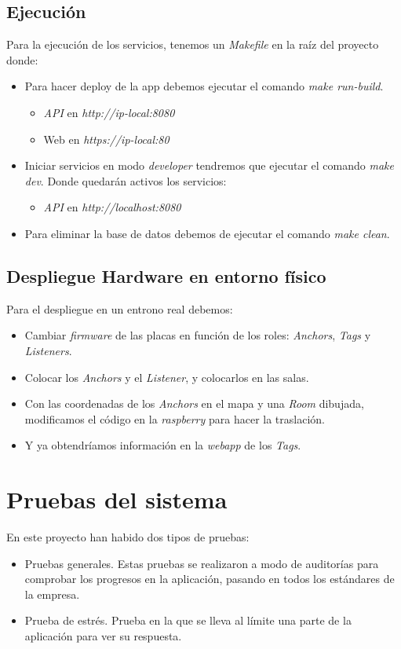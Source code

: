 \subsection{Ejecución}
Para la ejecución de los servicios, tenemos un \textit{Makefile} en la raíz del proyecto donde:
\begin{itemize}
    \item Para hacer deploy de la app debemos ejecutar el comando \textit{make run-build}.
    \begin{itemize}
        \item \textit{API} en \textit{http://ip-local:8080}
        \item Web en \textit{https://ip-local:80}
    \end{itemize}
    \item Iniciar servicios en modo \textit{developer} tendremos que ejecutar el comando \textit{make dev}. Donde quedarán activos los servicios:
    \begin{itemize}
        \item \textit{API} en \textit{http://localhost:8080}
    \end{itemize}
    
    \item Para eliminar la base de datos debemos de ejecutar el comando \textit{make clean}.
\end{itemize}
\subsection{Despliegue Hardware en entorno físico}
Para el despliegue en un entrono real debemos:
\begin{itemize}
    \item Cambiar \textit{firmware} de las placas en función de los roles: \textit{Anchors}, \textit{Tags} y \textit{Listeners}.
    \item Colocar los \textit{Anchors} y el \textit{Listener}, y colocarlos en las salas.
    \item Con las coordenadas de los \textit{Anchors} en el mapa y una \textit{Room} dibujada, modificamos el código en la \textit{raspberry} para hacer la traslación. 
    \item Y ya obtendríamos información en la \textit{webapp} de los \textit{Tags}.
\end{itemize}
\section{Pruebas del sistema}
En este proyecto han habido dos tipos de pruebas:
\begin{itemize}
    \item Pruebas generales. Estas pruebas se realizaron a modo de auditorías para comprobar los progresos en la aplicación, pasando en todos los estándares de la empresa.
    \item Prueba de estrés. Prueba en la que se lleva al límite una parte de la aplicación para ver su respuesta.
\end{itemize}
